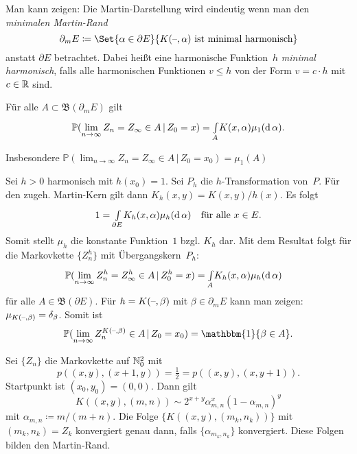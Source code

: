 \documentclass{cheat-sheet}
\renewcommand{\P}{\mathbb{P}} %
\newcommand{\ind}{\mathbbm{1}} %
\newcommand{\Bor}{\mathfrak{B}} %
\begin{document}
\begin{bem}
  Man kann zeigen: Die Martin-Darstellung wird eindeutig wenn man den \emph{minimalen Martin-Rand}
  \[
    \partial_m E \coloneqq \Set{\alpha \in \partial E}{K(\blank, \alpha) \text{ ist minimal harmonisch}}
  \]
  anstatt $\partial E$ betrachtet.
  Dabei heißt eine harmonische Funktion~$h$ \textit{minimal harmonisch}, falls alle harmonischen Funktionen $v \leq h$ von der Form $v = c \cdot h$ mit $c \in \mathbb{R}$ sind.
\end{bem}

\begin{resultat}
  Für alle $A \subset \Bor(\partial_m E)$ gilt
  \[
    \P(\lim_{n \to \infty} Z_n = Z_\infty \in A \,|\, Z_0 = x) =
    \myint{A}{} K(x, \alpha) \mu_1(\d\,\alpha).
  \]
\end{resultat}

\begin{bem}
  Insbesondere $\P(\lim_{n \to \infty} Z_n = Z_\infty \in A \,|\, Z_0 = x_0) = \mu_1(A)$
\end{bem}

\begin{bem}
  Sei $h > 0$ harmonisch mit $h(x_0) = 1$.
  Sei $P_h$ die $h$-Transformation von~$P$.
  Für den zugeh. Martin-Kern gilt dann $K_h(x, y) = K(x, y) / h(x)$.
  Es folgt
  \[
    1 = {\textstyle \int\limits_{\partial E}^{}} K_h(x, \alpha) \mu_h(\mathrm{d}\,\alpha) \quad
    \text{für alle } x \in E.
  \]
  Somit stellt $\mu_h$ die konstante Funktion~$1$ bzgl. $K_h$ dar.
  Mit dem Resultat folgt für die Markovkette $\{ Z_n^h \}$ mit Übergangskern~$P_h$:
  \[
    \P(\lim_{n \to \infty} Z_n^h = Z_\infty^h \in A \,|\, Z_0^h = x) = \myint{A}{} K_h(x, \alpha) \mu_h(\d\,\alpha) \quad
  \]
  für alle $A \in \Bor(\partial E)$.
  Für $h = K(\text{--}, \beta)$ mit $\beta \in \partial_m E$ kann man zeigen: $\mu_{K(\text{--}, \beta)} = \delta_\beta$.
  Somit ist
  \[
    \P(\lim_{n \to \infty} Z_n^{K(\blank, \beta)} \in A \,|\, Z_0 = x_0) = \ind \{ \beta \in A \}.
  \]
\end{bem}

\begin{bsp}
  Sei $\{ Z_n \}$ die Markovkette auf $\mathbb{N}_0^2$ mit
  \[
    p((x, y), (x+1, y)) = \tfrac{1}{2} = p((x, y), (x, y+1)).
  \]
  Startpunkt ist $(x_0, y_0) = (0, 0)$.
  Dann gilt
  \[
    K((x, y), (m, n)) \sim
    2^{x+y} \alpha_{m,n}^x (1-\alpha_{m,n})^y
  \]
  mit $\alpha_{m,n} \coloneqq m / (m+n)$.
  Die Folge $\{ K((x, y), (m_k, n_k)) \}$ mit $(m_k, n_k) = Z_k$ konvergiert genau dann, falls $\{ \alpha_{m_k,n_k} \}$ konvergiert.
  Diese Folgen bilden den Martin-Rand.
\end{bsp}
\end{document}
